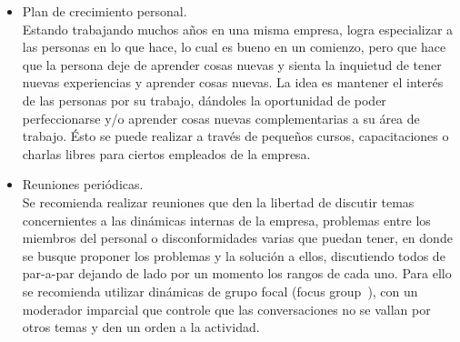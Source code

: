 \begin{itemize}
    \item Plan de crecimiento personal.\\
    Estando trabajando muchos años en una misma empresa, logra especializar a
    las personas en lo que hace, lo cual es bueno en un comienzo, pero que
    hace que la persona deje de aprender cosas nuevas y sienta la inquietud de
    tener nuevas experiencias y aprender cosas nuevas. La idea es mantener el
    interés de las personas por su trabajo\cite{interes}, dándoles la oportunidad de poder
    perfeccionarse y/o aprender cosas nuevas complementarias a su área de
    trabajo. Ésto se puede realizar a través de pequeños cursos,
    capacitaciones o charlas libres para ciertos empleados de la empresa.

    \item Reuniones periódicas.\\
    Se recomienda realizar reuniones que den la libertad de
    discutir temas concernientes a las dinámicas internas de la empresa,
    problemas entre los miembros del personal o disconformidades varias que
    puedan tener, en donde se busque proponer los problemas y la solución a
    ellos, discutiendo todos de par-a-par dejando de lado por un momento los
    rangos de cada uno. Para ello se recomienda utilizar dinámicas de grupo
    focal (focus group~\cite{Grupo_focal}), con un moderador imparcial que
    controle que las conversaciones no se vallan por otros temas y den un
    orden a la actividad.

\end{itemize}
